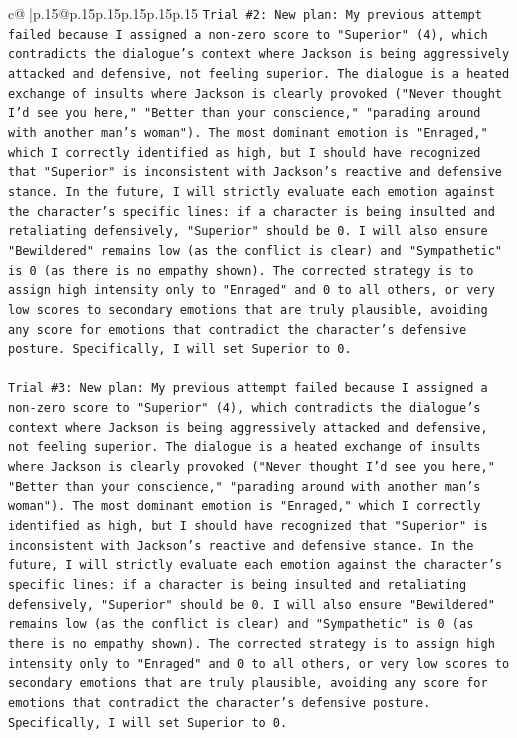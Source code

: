 \documentclass{article}
\begin{document}
{\begin{supertabular}{c@{$\;$}|p{.15\linewidth}@{}p{.15\linewidth}p{.15\linewidth}p{.15\linewidth}p{.15\linewidth}p{.15\linewidth}}
{{{\texttt{Trial \#2: New plan: My previous attempt failed because I assigned a non{-}zero score to "Superior" (4), which contradicts the dialogue's context where Jackson is being aggressively attacked and defensive, not feeling superior. The dialogue is a heated exchange of insults where Jackson is clearly provoked ("Never thought I'd see you here," "Better than your conscience," "parading around with another man's woman"). The most dominant emotion is "Enraged," which I correctly identified as high, but I should have recognized that "Superior" is inconsistent with Jackson's reactive and defensive stance. In the future, I will strictly evaluate each emotion against the character's specific lines: if a character is being insulted and retaliating defensively, "Superior" should be 0. I will also ensure "Bewildered" remains low (as the conflict is clear) and "Sympathetic" is 0 (as there is no empathy shown). The corrected strategy is to assign high intensity only to "Enraged" and 0 to all others, or very low scores to secondary emotions that are truly plausible, avoiding any score for emotions that contradict the character's defensive posture. Specifically, I will set Superior to 0.} \\
\\ 
\texttt{Trial \#3: New plan: My previous attempt failed because I assigned a non{-}zero score to "Superior" (4), which contradicts the dialogue's context where Jackson is being aggressively attacked and defensive, not feeling superior. The dialogue is a heated exchange of insults where Jackson is clearly provoked ("Never thought I'd see you here," "Better than your conscience," "parading around with another man's woman"). The most dominant emotion is "Enraged," which I correctly identified as high, but I should have recognized that "Superior" is inconsistent with Jackson's reactive and defensive stance. In the future, I will strictly evaluate each emotion against the character's specific lines: if a character is being insulted and retaliating defensively, "Superior" should be 0. I will also ensure "Bewildered" remains low (as the conflict is clear) and "Sympathetic" is 0 (as there is no empathy shown). The corrected strategy is to assign high intensity only to "Enraged" and 0 to all others, or very low scores to secondary emotions that are truly plausible, avoiding any score for emotions that contradict the character's defensive posture. Specifically, I will set Superior to 0.} \\
\\ 
\\ 
}}}
\end{supertabular}}
\end{document}
